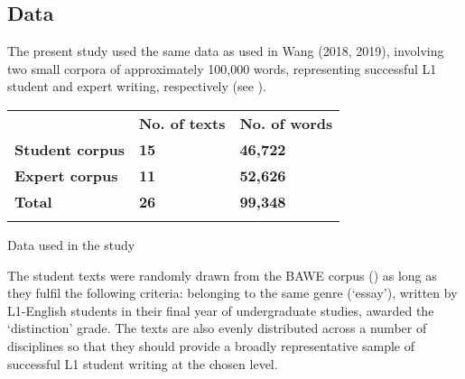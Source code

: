\subsection{Data}

The present study used the same data as used in Wang (2018, 2019), involving two small corpora of approximately 100,000 words, representing successful L1 student and expert writing, respectively (see ). 


\begin{tabularx}{\textwidth}{XXX} & {\bfseries No. of texts} & {\bfseries No. of words}\\

\lsptoprule
{\bfseries Student corpus} & {\bfseries \textmd{15}} & {\bfseries \textmd{46,722}}\\
{\bfseries Expert corpus} & {\bfseries \textmd{11}} & {\bfseries \textmd{52,626}}\\
{\bfseries Total} & {\bfseries \textmd{26}} & {\bfseries \textmd{99,348}}\\
\lspbottomrule
\end{tabularx}
\begin{table}
\caption{Data used in the study}
\label{tab:key:1}
\end{table}

The student texts were randomly drawn from the BAWE corpus (\citealt{NesiGardner2012}) as long as they fulfil the following criteria: belonging to the same genre (‘essay’), written by L1-English students in their final year of undergraduate studies, awarded the ‘distinction’ grade. The texts are also evenly distributed across a number of disciplines so that they should provide a broadly representative sample of successful L1 student writing at the chosen level. 

